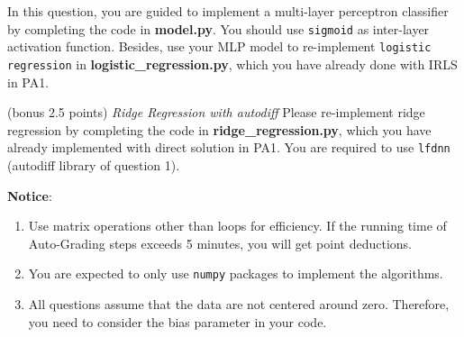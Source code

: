\documentclass[a4paper, 12pt]{exam}
\begin{document}
\begin{questions}
		In this question, you are guided to implement a multi-layer perceptron classifier by completing the code in \textbf{model.py}.
		You should use \texttt{sigmoid}
		as inter-layer activation function.
		Besides, use your MLP model to re-implement \texttt{logistic regression} in \textbf{logistic\_regression.py}, which you have already done with IRLS in PA1.
		
		\question (bonus 2.5 points) \emph{Ridge Regression with autodiff}
		Please re-implement ridge regression by completing the code in \textbf{ridge\_regression.py}, which you have already implemented with direct solution in PA1.
		You are required to use \texttt{lfdnn} (autodiff library of question 1).
	\end{questions}
	
	
	\nocite{*}
	\begin{flushleft}
		\textbf{Notice}: \\
		\begin{enumerate}
			\item Use matrix operations other than loops for efficiency. If the running time of Auto-Grading steps exceeds 5 minutes, you will get point deductions.
			\item You are expected to only use \texttt{numpy} packages to implement the algorithms.
			\item All questions assume that the data are not centered around zero. Therefore, you need to consider the bias parameter in your code.
		\end{enumerate}
	\end{flushleft}
	
\end{document}
